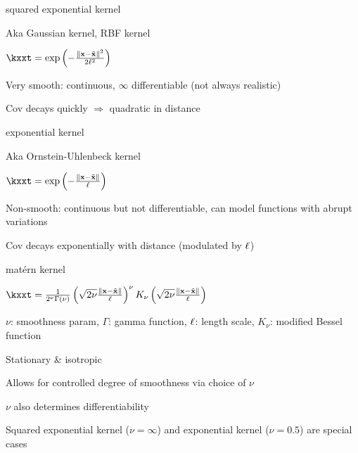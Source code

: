 \documentclass[11pt,compress,t,notes=noshow, xcolor=table]{beamer}
\begin{document}
\begin{framei}{squared exponential kernel}
\item Aka Gaussian kernel, RBF kernel
\item $\kxxt = \exp \left(-\frac{\xxtnorm^2}{2\ls^2} \right)$
\item Very smooth: continuous, $\infty$ differentiable (not always realistic)
\item Cov decays quickly $\Rightarrow$ quadratic in distance
\end{framei}

\begin{framei}{exponential kernel}
\item Aka Ornstein-Uhlenbeck kernel
\item $\kxxt = \exp \left(-\frac{\xxtnorm}{\ls} \right)$
\item Non-smooth: continuous but not differentiable, can model functions with abrupt variations
\item Cov decays exponentially with distance (modulated by $\ell$)
\end{framei}

\begin{framei}{matérn kernel}
\item $\kxxt = \frac{1}{2^\nu \Gamma(\nu)} \left( \sqrt{2 \nu} \frac{\xxtnorm}{\ls} \right)^\nu K_\nu \left( \sqrt{2 \nu} \frac{\xxtnorm}{\ls} \right)$
\item $\nu$: smoothness param, $\Gamma$: gamma function, $\ell$: length scale, $K_\nu$: modified Bessel function
\item Stationary \& isotropic
\item Allows for controlled degree of smoothness via choice of $\nu$
\item $\nu$ also determines differentiability
\item Squared exponential kernel ($\nu = \infty$) and exponential kernel ($\nu = 0.5$) are special cases
\vfill
{}
\end{framei}
\end{document}
